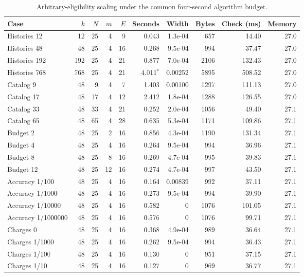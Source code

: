 \begin{table}[p]\centering\small\setlength{\tabcolsep}{3pt}
\caption{Arbitrary-eligibility scaling under the common four-second algorithm budget.}\label{tab:scale54}
\begin{tabular}{lrrrrrrrrr}\toprule
Case & $k$ & $N$ & $m$ & $E$ & Seconds & Width & Bytes & Check (ms) & Memory\\\midrule
Histories 12 & 12 & 25 & 4 & 9 & 0.043 & 1.3e-04 & 657 & 14.40 & 27.0\\
Histories 48 & 48 & 25 & 4 & 16 & 0.268 & 9.5e-04 & 994 & 37.47 & 27.0\\
Histories 192 & 192 & 25 & 4 & 21 & 0.877 & 7.0e-04 & 2106 & 132.43 & 27.0\\
Histories 768 & 768 & 25 & 4 & 21 & 4.011$^{*}$ & 0.00252 & 5895 & 508.52 & 27.0\\
Catalog 9 & 48 & 9 & 4 & 7 & 1.403 & 0.00100 & 1297 & 111.13 & 27.0\\
Catalog 17 & 48 & 17 & 4 & 12 & 2.412 & 1.8e-04 & 1288 & 126.55 & 27.0\\
Catalog 33 & 48 & 33 & 4 & 21 & 0.252 & 2.0e-04 & 1056 & 49.40 & 27.1\\
Catalog 65 & 48 & 65 & 4 & 28 & 0.635 & 5.3e-04 & 1171 & 109.86 & 27.1\\
Budget 2 & 48 & 25 & 2 & 16 & 0.856 & 4.3e-04 & 1190 & 131.34 & 27.1\\
Budget 4 & 48 & 25 & 4 & 16 & 0.264 & 9.5e-04 & 994 & 36.96 & 27.1\\
Budget 8 & 48 & 25 & 8 & 16 & 0.269 & 4.7e-04 & 995 & 39.83 & 27.1\\
Budget 12 & 48 & 25 & 12 & 16 & 0.274 & 4.7e-04 & 997 & 43.50 & 27.1\\
Accuracy 1/100 & 48 & 25 & 4 & 16 & 0.164 & 0.00839 & 992 & 37.11 & 27.1\\
Accuracy 1/1000 & 48 & 25 & 4 & 16 & 0.273 & 9.5e-04 & 994 & 39.90 & 27.1\\
Accuracy 1/10000 & 48 & 25 & 4 & 16 & 0.582 & 0 & 1076 & 101.05 & 27.1\\
Accuracy 1/1000000 & 48 & 25 & 4 & 16 & 0.576 & 0 & 1076 & 99.71 & 27.1\\
Charges 0 & 48 & 25 & 4 & 16 & 0.368 & 4.9e-04 & 989 & 36.64 & 27.1\\
Charges 1/1000 & 48 & 25 & 4 & 16 & 0.262 & 9.5e-04 & 994 & 36.43 & 27.1\\
Charges 1/100 & 48 & 25 & 4 & 16 & 0.130 & 0 & 951 & 37.15 & 27.1\\
Charges 1/10 & 48 & 25 & 4 & 16 & 0.127 & 0 & 969 & 36.77 & 27.1\\

\end{tabular}
\end{table}
